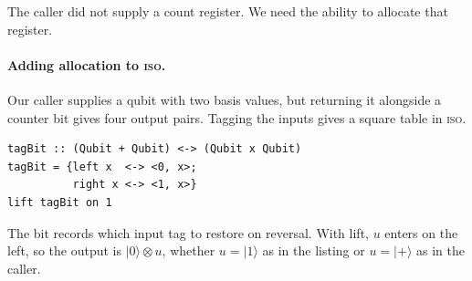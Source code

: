 \documentclass[acmsmall,screen,review,anonymous,nonacm]{acmart}
\newcommand{\storyinlineface}{\small\ttfamily}
\newcommand{\code}[1]{\textnormal{\storyinlineface #1}}
\newcommand{\ket}[1]{\lvert #1\rangle}
\numberwithin{equation}{section}
\begin{document}
\smallskip\indent The caller did not supply a count register. We need the ability to
allocate that register.

\paragraph{Adding allocation to \textsc{iso}.}
Our caller supplies a qubit with two basis values, but returning it alongside
a counter bit gives four output pairs. Tagging the inputs gives a square table in \textsc{iso}.

\par\smallskip\noindent\begin{minipage}[c]{.63\linewidth}
\begin{lstlisting}
tagBit :: (Qubit + Qubit) <-> (Qubit x Qubit)
tagBit = {left x  <-> <0, x>;
          right x <-> <1, x>}
lift tagBit on 1
\end{lstlisting}
\end{minipage}\hfill
\begin{minipage}[c]{.345\linewidth}\centering
{}
\end{minipage}\par\smallskip
The bit records which input tag to restore on reversal. With \code{lift}, $u$ enters on
the left, so the output is $\ket0\otimes u$, whether $u=\ket1$ as in the listing or
$u=\ket+$ as in the caller.
\end{document}
